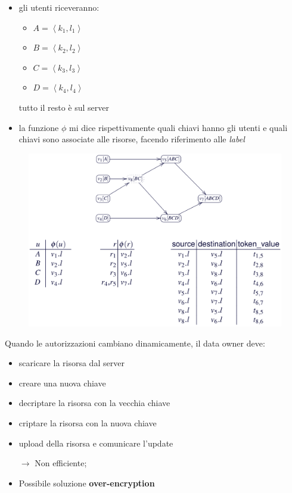 \documentclass{report}
\begin{document}
\newpage
\begin{itemize}
    \item gli utenti riceveranno:
    \begin{itemize}
        \item $A = \left\langle k_1, l_1 \right\rangle$
        \item $B = \left\langle k_2, l_2 \right\rangle$
        \item $C = \left\langle k_3, l_3 \right\rangle$
        \item $D = \left\langle k_4, l_4 \right\rangle$
    \end{itemize}

    tutto il resto è sul server
    \item la funzione $\phi$ mi dice rispettivamente quali chiavi hanno gli utenti e quali chiavi sono associate alle risorse,
    facendo riferimento alle \textit{label}
\end{itemize}

\begin{figure}[ht]
    \centering
    \includegraphics[width=0.92\linewidth]{images/encryption/graph2.png}
\end{figure}

\noindent Quando le autorizzazioni cambiano dinamicamente, il data owner deve:
\begin{itemize}
    \item scaricare la risorsa dal server 
    \item creare una nuova chiave 
    \item decriptare la risorsa con la vecchia chiave 
    \item criptare la risorsa con la nuova chiave 
    \item upload della risorsa e comunicare l'update 
    
    $\rightarrow$ Non efficiente;

    \item Possibile soluzione \textbf{over-encryption}
\end{itemize}
\end{document}
